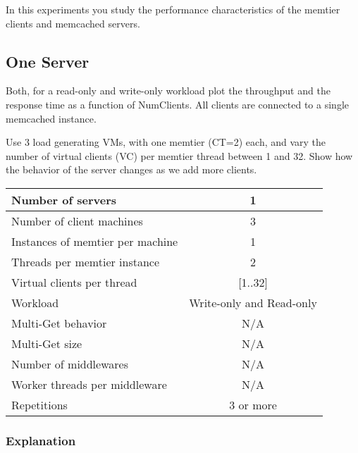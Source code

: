\documentclass[11pt,a4paper]{article}
\begin{document}
In this experiments you study the performance characteristics of the memtier clients and memcached servers.

\subsection{One Server}

Both, for a read-only and write-only workload plot the throughput and the response time as a function of NumClients. All clients are connected to a single memcached instance.

Use 3 load generating VMs, with one memtier (CT=2) each, and vary the number of virtual clients (VC) per memtier thread between 1 and 32. Show how the behavior of the server changes as we add more clients.

\begin{center}
	\scriptsize{
		\begin{tabular}{|l|c|}
			\hline Number of servers                & 1                        \\ 
			\hline Number of client machines        & 3                        \\ 
			\hline Instances of memtier per machine & 1                        \\ 
			\hline Threads per memtier instance     & 2                        \\
			\hline Virtual clients per thread       & [1..32]                  \\ 
			\hline Workload                         & Write-only and Read-only \\
			\hline Multi-Get behavior               & N/A                      \\
			\hline Multi-Get size                   & N/A                      \\
			\hline Number of middlewares            & N/A                      \\
			\hline Worker threads per middleware    & N/A                      \\
			\hline Repetitions                      & 3 or more                \\ 
			\hline 
		\end{tabular}
	} 
\end{center}

\subsubsection{Explanation}
\end{document}
